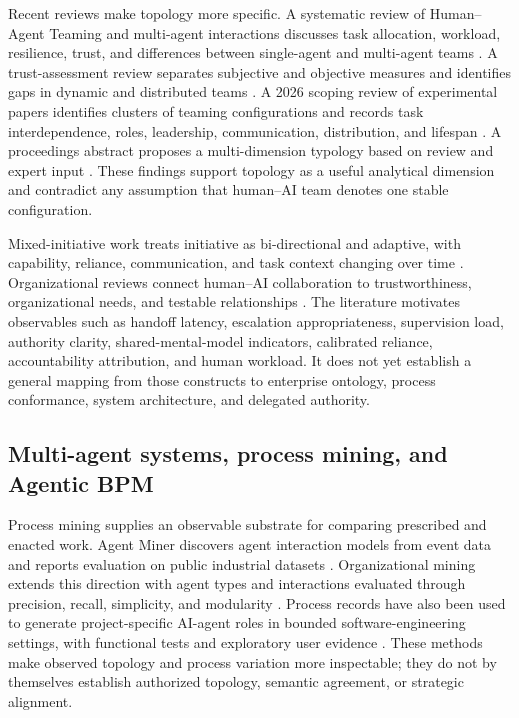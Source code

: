 \documentclass[11pt,letterpaper]{article}
\newcommand{\parencite}[1]{\citep{#1}}
\begin{document}
Recent reviews make topology more specific. A systematic review of Human--Agent Teaming and multi-agent interactions discusses task allocation, workload, resilience, trust, and differences between single-agent and multi-agent teams \parencite{yu2025hat}. A trust-assessment review separates subjective and objective measures and identifies gaps in dynamic and distributed teams \parencite{jahan2025trust}. A 2026 scoping review of experimental papers identifies clusters of teaming configurations and records task interdependence, roles, leadership, communication, distribution, and lifespan \parencite{hughes2026teams}. A proceedings abstract proposes a multi-dimension typology based on review and expert input \parencite{engelhardt2026typology}. These findings support topology as a useful analytical dimension and contradict any assumption that human--AI team denotes one stable configuration.

Mixed-initiative work treats initiative as bi-directional and adaptive, with capability, reliance, communication, and task context changing over time \parencite{natarajan2025mixed}. Organizational reviews connect human--AI collaboration to trustworthiness, organizational needs, and testable relationships \parencite{dokhac2026hai}. The literature motivates observables such as handoff latency, escalation appropriateness, supervision load, authority clarity, shared-mental-model indicators, calibrated reliance, accountability attribution, and human workload. It does not yet establish a general mapping from those constructs to enterprise ontology, process conformance, system architecture, and delegated authority.

\subsection{Multi-agent systems, process mining, and Agentic BPM}
Process mining supplies an observable substrate for comparing prescribed and enacted work. Agent Miner discovers agent interaction models from event data and reports evaluation on public industrial datasets \parencite{tour2023agentminer}. Organizational mining extends this direction with agent types and interactions evaluated through precision, recall, simplicity, and modularity \parencite{orgmining2026}. Process records have also been used to generate project-specific AI-agent roles in bounded software-engineering settings, with functional tests and exploratory user evidence \parencite{bala2026agents}. These methods make observed topology and process variation more inspectable; they do not by themselves establish authorized topology, semantic agreement, or strategic alignment.
\end{document}
